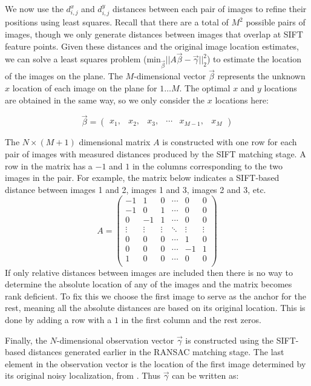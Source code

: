 \documentclass[10pt,twocolumn,letterpaper]{article}
\begin{document}
We now use the $d^x_{i,j}$ and $d^y_{i,j}$ distances between each pair
of images to refine their positions using least squares. Recall that
there are a total of $M^{2}$ possible pairs of images, though we only
generate distances between images that overlap at SIFT feature
points. Given these distances and the original image location
estimates, we can solve a least squares problem
($\textrm{min}_{\vec{\beta}} ||A \vec{\beta} - \vec{\gamma}||_2^2 $)
to estimate the location of the images on the plane. The
$M$-dimensional vector $\vec{\beta}$ represents the unknown $x$
location of each image on the plane for $1 \dots M$. The optimal $x$
and $y$ locations are obtained in the same way, so we only consider
the $x$ locations here:

\[\vec{\beta} =
\begin{pmatrix}
  x_1, & x_2, & x_3, & \cdots & x_{M-1}, & x_M
\end{pmatrix}
\]

The $N \times (M+1)$ dimensional matrix $A$ is constructed with one
row for each pair of images with measured distances produced by the
SIFT matching stage. A row in the matrix has a $-1$ and $1$ in the
columns corresponding to the two images in the pair. For example, the
matrix below indicates a SIFT-based distance between images 1 and 2,
images 1 and 3, images 2 and 3, etc.
\[
A =
\begin{pmatrix}
  -1 & 1 & 0 & \cdots & 0 & 0\\
  -1 & 0 & 1 & \cdots & 0 & 0\\
  0 & -1 & 1 & \cdots & 0 & 0\\
  \vdots  & \vdots & \vdots & \ddots & \vdots  & \vdots\\
  0 & 0 & 0 & \cdots & 1 & 0 \\
  0 & 0 & 0 & \cdots & -1 & 1 \\
  1 & 0 & 0 & \cdots & 0 & 0 \\
\end{pmatrix}
\]
If only relative distances between images are included then there is
no way to determine the absolute location of any of the images and the
matrix becomes rank deficient. To fix this we choose the first image
to serve as the anchor for the rest, meaning all the absolute
distances are based on its original location. This is done by adding a
row with a $1$ in the first column and the rest zeros.

Finally, the $N$-dimensional observation vector $\vec{\gamma}$ is
constructed using the SIFT-based distances generated earlier in the
RANSAC matching stage. The last element in the observation vector is
the location of the first image determined by its original noisy
localization, from \cite{chen2010indoor, liu2010indoor}. Thus
$\vec{\gamma}$ can be written as:
\end{document}
